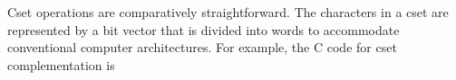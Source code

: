 Cset operations are comparatively straightforward. The characters in a
cset are represented by a bit vector that is divided into words to
accommodate conventional computer architectures. For example, the C
code for cset complementation is

\goodbreak
